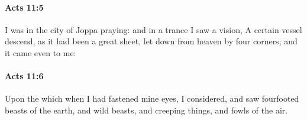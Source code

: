 		\paragraph{Acts 11:5} %
			\label{ACTS-11-5}

			I was in the city of Joppa praying: and in a trance I saw a vision, A certain vessel descend, as it had been a great sheet, let down from heaven by four corners; and it came even to me:

			\begin{framed}
			\scriptsize
				\begin{compactdesc}
					\item[SBLG] 
				\end{compactdesc}
			\end{framed}

		\paragraph{Acts 11:6} %
			\label{ACTS-11-6}

			Upon the which when I had fastened mine eyes, I considered, and saw fourfooted beasts of the earth, and wild beasts, and creeping things, and fowls of the air.

